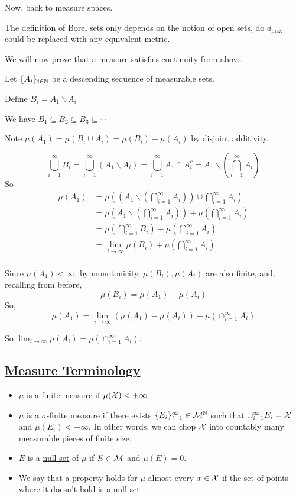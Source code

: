 \documentclass[x11names,reqno,14pt]{extarticle}
\newcommand*{\oo}{\infty}
\newcommand{\seq}[1]{_{#1 = 1}^\oo}
\begin{document}
Now, back to measure spaces. 

\rem

The definition of Borel sets only depends on the notion of open sets, do $d_{\max}$ could be replaced with any equivalent metric. 

We will now prove that a measure satisfies continuity from above.

\proof

Let $\{A_i\}_{i\in\mathbb{N}}$ be a descending sequence of measurable sets.

Define $B_i = A_1\backslash A_i $

We have $B_1\subseteq B_2\subseteq B_3 \subseteq\cdots$

Note $\mu(A_1) = \mu(B_i\cup A_i) = \mu(B_i) + \mu(A_i)$ by disjoint additivity.

\[
\bigcup_{i=1}^\oo B_i = \bigcup\seq{i} (A_1\backslash A_i) = \bigcup_{i=1}^\oo A_1 \cap A_i^c = A_1 \backslash \left(\bigcap_{i=1}^\oo A_i\right)
\]
So
\begin{align*}
\mu(A_1) & = \mu\left(\left(A_1 \backslash\left(\bigcap_{i=1}^\oo A_i\right)\right)\cup \bigcap_{i=1}^\oo A_i \right) \\
         & = \mu\left(A_1 \backslash \left(\bigcap_{i=1}^\oo A_i\right)\right) + \mu\left(\bigcap_{i=1}^\oo A_i\right) \\
			& = \mu\left(\bigcap_{i=1}^\oo B_i\right) + \mu\left(\bigcap_{i=1}^\oo A_i\right) \\
			& = \lim_{i\to\oo}\mu(B_i) + \mu\left(\bigcap_{i=1}^\oo A_i\right) \\
\end{align*}

Since $\mu(A_1) < \oo$, by monotonicity, $\mu(B_i), \mu(A_i)$ are also finite, and, recalling from before,
\[
\mu(B_i) = \mu(A_1) - \mu(A_i)
\]
So, 
\[
\mu(A_1) = \lim_{i\to\oo}(\mu(A_1) - \mu(A_i)) + \mu(\cap_{i=1}^\oo A_i)
\]

So $\lim_{i\to\oo}\mu(A_i) = \mu(\cap_{i=1}^\oo A_i)$. 

\subsection*{\underline{Measure Terminology}}

\begin{itemize}
\item $\mu$ is a \underline{finite measure} if $\mu(\mc{X}) < + \oo$. 
\item $\mu$ is a \underline{$\sigma$-finite measure} if there exists $\{E_i\}\seq{i}\in \mc{M}^{\N}$ such that $\cup_{i=1}^\oo E_i = \mc{X}$ and $\mu(E_i) < +\oo$. In other words, we can chop $\mathcal{X}$ into countably many measurable pieces of finite size. 
\item $E$ is a \underline{null set} of $\mu$ if $E \in \mathcal{M}$ and $\mu(E) = 0$. 
\item We say that a property holds for \underline{$\mu$-almost every $x \in \mathcal{X}$} if the set of points where it doesn't hold is a null set. 
\end{itemize}
\end{document}
